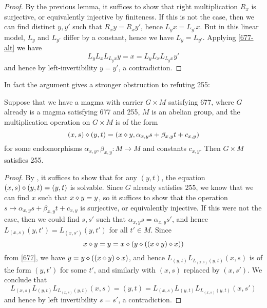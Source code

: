 \begin{proof}  By the previous lemma, it suffices to show that right multiplication $R_x$ is surjective, or equivalently injective by finiteness.  If this is not the case, then we can find distinct $y,y'$ such that $R_x y = R_x y'$, hence $L_y x = L_{y'} x$. But in this linear model, $L_y$ and $L_{y'}$ differ by a constant, hence we have $L_y = L_{y'}$.  Applying \eqref{677-alt} we have
$$  L_y L_x L_{L_y x} y = x =  L_y L_x L_{L_y x} y'$$
and hence by left-invertibility $y=y'$, a contradiction.
\end{proof}

In fact the argument gives a stronger obstruction to refuting 255:

\begin{lemma}\label{linear-2} Suppose that we have a magma with carrier $G \times M$ satisfying 677, where $G$ already is a magma satisfying 677 and 255, $M$ is an abelian group, and the multiplication operation on $G \times M$ is of the form
  $$ (x,s) \diamond (y,t) = (x \diamond y, \alpha_{x,y} s + \beta_{x,y} t + c_{x,y})$$
for some endomorphisms $\alpha_{x,y},\beta_{x,y}: M \to M$ and constants $c_{x,y}$.  Then $G \times M$ satisfies 255.
\end{lemma}

\begin{proof}  By , it suffices to show that for any $(y,t)$, the equation $(x,s) \diamond (y,t) = (y,t)$ is solvable.  Since $G$ already satisfies 255, we know that we can find $x$ such that $x \diamond y = y$, so it suffices to show that the operation $s \mapsto \alpha_{x,y} s + \beta_{x,y} t + c_{x,y}$ is surjective, or equivalently injective.  If this were not the case, then we could find $s,s'$ such that $\alpha_{x,y} s = \alpha_{x,y} s'$, and hence $L_{(x,s)} (y,t') = L_{(x,s')} (y,t')$ for all $t' \in M$.  Since
  $$ x \diamond y = y = x \diamond (y \diamond ((x \diamond y) \diamond x))$$
  from \eqref{677}, we have $y = y \diamond ((x \diamond y) \diamond x)$, and hence $L_{(y,t)} L_{L_{(x,s)} (y,t)} (x,s)$ is of the form $(y,t')$ for some $t'$, and similarly with $(x,s)$ replaced by $(x,s')$.  We conclude that
$$ L_{(x,s)} L_{(y,t)} L_{L_{(x,s)} (y,t)} (x,s) = (y,t) =
L_{(x,s)} L_{(y,t)} L_{L_{(x,s)} (y,t)} (x,s')$$
and hence by left invertibility $s=s'$, a contradiction.
\end{proof}

